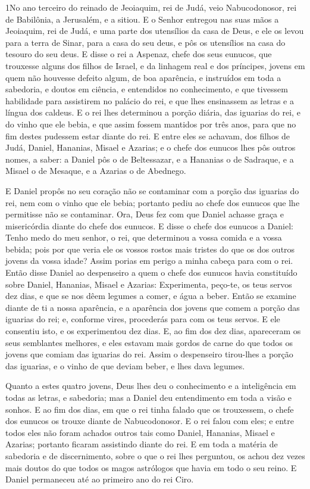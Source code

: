 
\lettrine{1} No ano terceiro do reinado de Jeoiaquim, rei de
Judá, veio Nabucodonosor, rei de Babilônia, a Jerusalém, e a sitiou.
E o Senhor entregou nas suas mãos a Jeoiaquim, rei de Judá, e
uma parte dos utensílios da casa de Deus, e ele os levou para a
terra de Sinar, para a casa do seu deus, e pôs os utensílios na casa
do tesouro do seu deus. E disse o rei a Aspenaz, chefe dos seus
eunucos, que trouxesse alguns dos filhos de Israel, e da linhagem
real e dos príncipes, jovens em quem não houvesse defeito algum,
de boa aparência, e instruídos em toda a sabedoria, e doutos em
ciência, e entendidos no conhecimento, e que tivessem habilidade
para assistirem no palácio do rei, e que lhes ensinassem as letras e
a língua dos caldeus. E o rei lhes determinou a porção diária,
das iguarias do rei, e do vinho que ele bebia, e que assim fossem
mantidos por três anos, para que no fim destes pudessem estar diante
do rei. E entre eles se achavam, dos filhos de Judá, Daniel,
Hananias, Misael e Azarias; e o chefe dos eunucos lhes pôs
outros nomes, a saber: a Daniel pôs o de Beltessazar, e a Hananias o
de Sadraque, e a Misael o de Mesaque, e a Azarias o de Abednego.

E Daniel propôs no seu coração não se contaminar com a porção das
iguarias do rei, nem com o vinho que ele bebia; portanto pediu ao
chefe dos eunucos que lhe permitisse não se contaminar. Ora,
Deus fez com que Daniel achasse graça e misericórdia diante do chefe
dos eunucos. E disse o chefe dos eunucos a Daniel: Tenho medo
do meu senhor, o rei, que determinou a vossa comida e a vossa
bebida; pois por que veria ele os vossos rostos mais tristes do que
os dos outros jovens da vossa idade? Assim porias em perigo a minha
cabeça para com o rei. Então disse Daniel ao despenseiro a
quem o chefe dos eunucos havia constituído sobre Daniel, Hananias,
Misael e Azarias: Experimenta, peço-te, os teus servos dez
dias, e que se nos dêem legumes a comer, e água a beber.
Então se examine diante de ti a nossa aparência, e a
aparência dos jovens que comem a porção das iguarias do rei; e,
conforme vires, procederás para com os teus servos. E ele
consentiu isto, e os experimentou dez dias. E, ao fim dos dez
dias, apareceram os seus semblantes melhores, e eles estavam mais
gordos de carne do que todos os jovens que comiam das iguarias do
rei. Assim o despenseiro tirou-lhes a porção das iguarias, e
o vinho de que deviam beber, e lhes dava legumes.

Quanto a estes quatro jovens, Deus lhes deu o conhecimento e a
inteligência em todas as letras, e sabedoria; mas a Daniel deu
entendimento em toda a visão e sonhos. E ao fim dos dias, em
que o rei tinha falado que os trouxessem, o chefe dos eunucos os
trouxe diante de Nabucodonosor. E o rei falou com eles; e
entre todos eles não foram achados outros tais como Daniel,
Hananias, Misael e Azarias; portanto ficaram assistindo diante do
rei. E em toda a matéria de sabedoria e de discernimento,
sobre o que o rei lhes perguntou, os achou dez vezes mais doutos do
que todos os magos astrólogos que havia em todo o seu reino.
E Daniel permaneceu até ao primeiro ano do rei Ciro.

